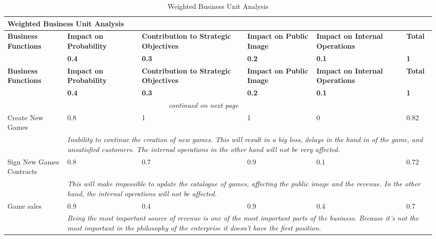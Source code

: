 \begin{longtable}{| p{3.4cm} | p{2cm} | p{2cm} | p{2cm} | p{2cm} | p{1cm} |}
		\caption{Weighted Business Unit Analysis}\label{tab:BUA}\\
		\hline \multicolumn{6}{|p{12.4cm}|}{\textbf{Weighted Business Unit Analysis}}\\\hline
		\textbf{Business Functions} & \textbf{Impact on Probability} & \textbf{Contribution to Strategic Objectives} & \textbf{Impact on Public Image} & 	\textbf{Impact on Internal Operations} & \textbf{Total}\\
		  & \textbf{0.4} & \textbf{0.3} & \textbf{0.2} & \textbf{0.1} & \textbf{1}\\\hline
		\endfirsthead
		\textbf{Business Functions} & \textbf{Impact on Probability} & \textbf{Contribution to Strategic Objectives} & \textbf{Impact on Public Image} & 	\textbf{Impact on Internal Operations} & \textbf{Total}\\
		 & \textbf{0.4} & \textbf{0.3} & \textbf{0.2} & \textbf{0.1} & \textbf{1}\\\hline
		\endhead
		\multicolumn{5}{|c|}{\textit{continued on next page}}\\
		\endfoot
		\endlastfoot
		Create New Games & 0.8 & 1 & 1 & 0 & 0.82\\\hline
		& \multicolumn{5}{|p{9cm}|}{\textit{Inability to continue the creation of new games. This will result in a big loss, delays in the hand in of the game, and unsatisfied customers. The internal operations in the other hand will not be very affected.}}\\\hline
		Sign New Games Contracts & 0.8 & 0.7 & 0.9 & 0.1 & 0.72\\\hline
		& \multicolumn{5}{|p{9cm}|}{\textit{This will make impossible to update the catalogue of games, affecting the public image and the revenue. In the other hand, the internal operations will not be affected.}}\\\hline
		Game sales & 0.9 & 0.4 & 0.9 & 0.4 & 0.7\\\hline
		& \multicolumn{5}{|p{9cm}|}{\textit{Being the most important source of revenue is one of the most important parts of the business. Because it's not the most important in the philosophy of the enterprise it doesn't have the first position.}}\\\hline

\end{longtable}
